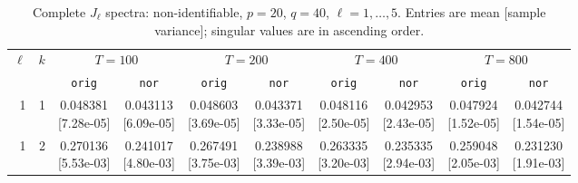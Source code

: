\documentclass[12pt,letterpaper]{article}
\def\spacingset#1{\renewcommand{\baselinestretch}{#1}\small\normalsize}
\theoremstyle{plain}
\theoremstyle{definition}
\begin{document}
\clearpage
\begin{table}[p]
\begingroup
\spacingset{1.0}
\small\centering
\caption{Complete $J_\ell$ spectra: non-identifiable, $p=20$, $q=40$, $\ell=1,\ldots,5$. Entries are mean [sample variance]; singular values are in ascending order.}
\label{s23:lambda:alltab:spectra:p20q40exterior:1-5}
\footnotesize
\setlength{\tabcolsep}{2.2pt}
\renewcommand{\arraystretch}{1.03}
\begin{adjustbox}{max width=\linewidth}
\begin{tabular}{@{}rr*{8}{c}@{}}
\toprule
$\ell$ & $k$ & \multicolumn{2}{c}{$T=100$} & \multicolumn{2}{c}{$T=200$} & \multicolumn{2}{c}{$T=400$} & \multicolumn{2}{c}{$T=800$}\\
\cmidrule(lr){3-4}\cmidrule(lr){5-6}\cmidrule(lr){7-8}\cmidrule(lr){9-10}
 &  & \texttt{orig} & \texttt{nor} & \texttt{orig} & \texttt{nor} & \texttt{orig} & \texttt{nor} & \texttt{orig} & \texttt{nor}\\
\midrule
1 & 1 & \shortstack{0.048381\\[-1pt]{\scriptsize[7.28e-05]}} & \shortstack{0.043113\\[-1pt]{\scriptsize[6.09e-05]}} & \shortstack{0.048603\\[-1pt]{\scriptsize[3.69e-05]}} & \shortstack{0.043371\\[-1pt]{\scriptsize[3.33e-05]}} & \shortstack{0.048116\\[-1pt]{\scriptsize[2.50e-05]}} & \shortstack{0.042953\\[-1pt]{\scriptsize[2.43e-05]}} & \shortstack{0.047924\\[-1pt]{\scriptsize[1.52e-05]}} & \shortstack{0.042744\\[-1pt]{\scriptsize[1.54e-05]}}\\
1 & 2 & \shortstack{0.270136\\[-1pt]{\scriptsize[5.53e-03]}} & \shortstack{0.241017\\[-1pt]{\scriptsize[4.80e-03]}} & \shortstack{0.267491\\[-1pt]{\scriptsize[3.75e-03]}} & \shortstack{0.238988\\[-1pt]{\scriptsize[3.39e-03]}} & \shortstack{0.263335\\[-1pt]{\scriptsize[3.20e-03]}} & \shortstack{0.235335\\[-1pt]{\scriptsize[2.94e-03]}} & \shortstack{0.259048\\[-1pt]{\scriptsize[2.05e-03]}} & \shortstack{0.231230\\[-1pt]{\scriptsize[1.91e-03]}}\\

\end{tabular}
\end{adjustbox}
\end{table}
\end{document}

